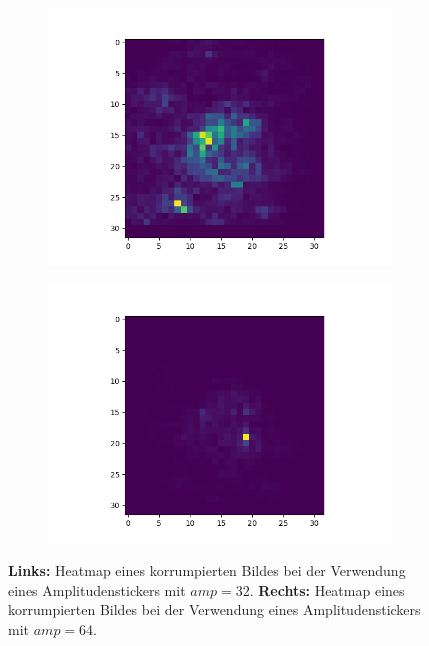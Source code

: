 \documentclass[twoside, 12pt,a4paper]{book}
\numberwithin{equation}{section}
\begin{document}
	\begin{figure}
		\centering
		\begin{subfigure}{.5\textwidth}
			\centering
			\includegraphics[width=.7\linewidth]{140_poison_CLPA_1sticker_amp32n5d10e-rule_heatmap.png}
			
		\end{subfigure}%
		\begin{subfigure}{.5\textwidth}
			\centering
			\includegraphics[width=.7\linewidth]{140_poison_CLPA_1sticker_amp64n5d10e-rule_heatmap.png}
			
		\end{subfigure}
		\caption[Vergleich zweier Heatmaps mit Amplitudenstickern.]{\textbf{Links:} Heatmap eines korrumpierten Bildes bei der Verwendung eines Amplitudenstickers mit $amp=32$.  \textbf{Rechts:} Heatmap eines korrumpierten Bildes bei der Verwendung eines Amplitudenstickers mit $amp=64$.}
		
		
		\label{fig:vergleich_heatmaps_red_Amplituden}
	\end{figure}
	
\end{document}
